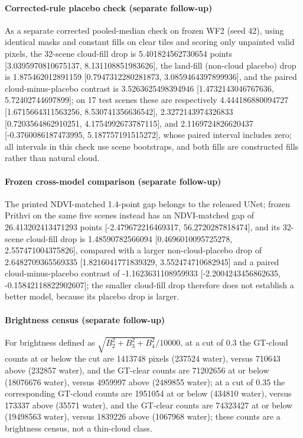 
\paragraph{Corrected-rule placebo check (separate follow-up)} As a separate corrected pooled-median check on frozen WF2 (seed 42), using identical masks and constant fills on clear tiles and scoring only unpainted valid pixels, the 32-scene cloud-fill drop is 5.401824562730654 points [3.0395970810675137, 8.131108851983626], the land-fill (non-cloud placebo) drop is 1.875462012891159 [0.7947312280281873, 3.0859464397899936], and the paired cloud-minus-placebo contrast is 3.5263625498394946 [1.4732143046767636, 5.72402744697899]; on 17 test scenes these are respectively 4.444186880094727 [1.6715664311563256, 8.530741356636542], 2.3272143974326833 [0.7203564862910251, 4.1754992673787115], and 2.1169724826620437 [-0.3760086187473995, 5.187757191515272], whose paired interval includes zero; all intervals in this check use scene bootstraps, and both fills are constructed fills rather than natural cloud.

\paragraph{Frozen cross-model comparison (separate follow-up)} The printed NDVI-matched 1.4-point gap belongs to the released UNet; frozen Prithvi on the same five scenes instead has an NDVI-matched gap of 26.413202413471293 points [-2.479672216469317, 56.2720287818474], and its 32-scene cloud-fill drop is 1.48590782566094 [0.4696010095725278, 2.557471004375826], compared with a larger non-cloud-placebo drop of 2.6482709365569335 [1.8216041771839329, 3.552474710682945] and a paired cloud-minus-placebo contrast of -1.1623631108959933 [-2.2004243456862635, -0.15842118822902607]; the smaller cloud-fill drop therefore does not establish a better model, because its placebo drop is larger.

\paragraph{Brightness census (separate follow-up)} For brightness defined as $\sqrt{B_2^2+B_3^2+B_4^2}/10000$, at a cut of 0.3 the GT-cloud counts at or below the cut are 1413748 pixels (237524 water), versus 710643 above (232857 water), and the GT-clear counts are 71202656 at or below (18076676 water), versus 4959997 above (2489855 water); at a cut of 0.35 the corresponding GT-cloud counts are 1951054 at or below (434810 water), versus 173337 above (35571 water), and the GT-clear counts are 74323427 at or below (19498563 water), versus 1839226 above (1067968 water); these counts are a brightness census, not a thin-cloud class.
